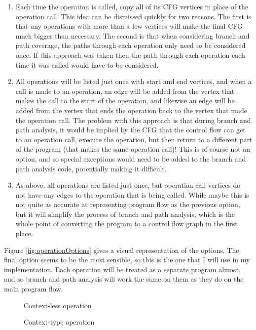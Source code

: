 \begin{enumerate}
\item Each time the operation is called, copy all of its CFG vertices in place of the operation call. This idea can be dismissed quickly for two reasons. The first is that any operations with more than a few vertices will make the final CFG much bigger than necessary. The second is that when considering branch and path coverage, the paths through each operation only need to be considered once. If this approach was taken then the path through each operation each time it was called would have to be considered.
\item All operations will be listed just once with start and end vertices, and when a call is made to an operation, an edge will be added from the vertex that makes the call to the start of the operation, and likewise an edge will be added from the vertex that ends the operation back to the vertex that made the operation call. The problem with this approach is that during branch and path analysis, it would be implied by the CFG that the control flow can get to an operation call, execute the operation, but then return to a different part of the program (that makes the same operation call)! This is of course not an option, and so special exceptions would need to be added to the branch and path analysis code, potentially making it difficult.
\item As above, all operations are listed just once, but operation call vertices do not have any edges to the operation that is being called. While maybe this is not quite as accurate at representing program flow as the previous option, but it will simplify the process of branch and path analysis, which is the whole point of converting the program to a control flow graph in the first place.
\end{enumerate}

Figure \ref{fig:operationOptions} gives a visual representation of the options. The final option seems to be the most sensible, so this is the one that I will use in my implementation. Each operation will be treated as a separate program almost, and so branch and path analysis will work the same on them as they do on the main program flow.

\begin{figure}

\caption{Context-less operation}
\label{lst:contextlessOp}
\end{figure}

\begin{figure}

\caption{Context-type operation}
\label{lst:contexttypeOp}
\end{figure}

